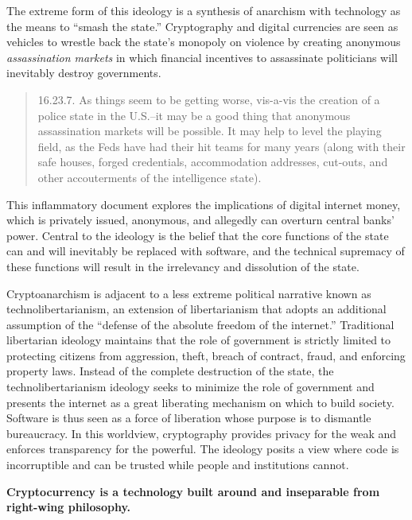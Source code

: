 The extreme form of this ideology is a synthesis of anarchism with technology as
the means to ``smash the state.'' Cryptography and digital currencies are seen
as vehicles to wrestle back the state's monopoly on violence by creating
anonymous \textit{assassination markets} in which financial incentives to
assassinate politicians will inevitably destroy governments.


\begin{quote}
16.23.7. As things seem to be getting worse, vis-a-vis the creation of a
police state in the U.S.--it may be a good thing that anonymous
assassination markets will be possible. It may help to level the playing
field, as the Feds have had their hit teams for many years (along with
their safe houses, forged credentials, accommodation addresses,
cut-outs, and other accouterments of the intelligence state).
\end{quote}

This inflammatory document explores the implications of digital internet money,
which is privately issued, anonymous, and allegedly can overturn central banks'
power. Central to the ideology is the belief that the core functions of the
state can and will inevitably be replaced with software, and the technical
supremacy of these functions will result in the irrelevancy and dissolution of
the state.

Cryptoanarchism is adjacent to a less extreme political narrative known as
technolibertarianism, an extension of libertarianism that adopts an additional
assumption of the ``defense of the absolute freedom of the internet.''
Traditional libertarian ideology maintains that the role of government is
strictly limited to protecting citizens from aggression, theft, breach of
contract, fraud, and enforcing property laws. Instead of the complete
destruction of the state, the technolibertarianism ideology seeks to minimize
the role of government and presents the internet as a great liberating mechanism
on which to build society.  Software is thus seen as a force of liberation whose
purpose is to dismantle bureaucracy. In this worldview, cryptography provides
privacy for the weak and enforces transparency for the powerful.
\cite{assange_cypherpunks_2016} The ideology posits a view where code is
incorruptible and can be trusted while people and institutions cannot.
\cite{krugman_brutal_2021}

\begin{infobox}
 \textbf{
  Cryptocurrency is a technology built around and inseparable from right-wing
  philosophy.
  }
\end{infobox}

